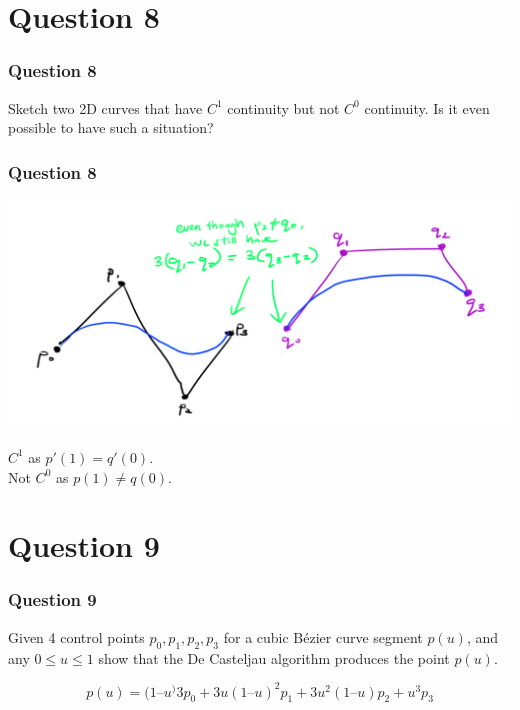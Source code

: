 \documentclass{beamer}
\begin{document}
\section{Question 8}

\begin{frame}
    \frametitle{Question 8}
    Sketch two 2D curves that have $C^1$ continuity but not $C^0$ continuity. Is it even possible to have such a situation?
\end{frame}

\begin{frame}
    \frametitle{Question 8}

    \centering
    \includegraphics[scale=0.4]{q8.png}
    \vspace{1em}

    $C^1$ as $p'(1) = q'(0)$.\\
    Not $C^0$ as $p(1) \neq q(0)$.

\end{frame}

\section{Question 9}

\begin{frame}
    \frametitle{Question 9}
    Given 4 control points $p_0, p_1, p_2, p_3$ for a cubic Bézier curve segment $p(u)$, and any $0 \le u \le 1$
    show that the De Casteljau algorithm produces the point $p(u)$.

    \begin{tcolorbox}
        \begin{equation}
            p(u) = (1–u^)3 p_0 + 3u (1–u)^2 p_1 + 3u^2 (1–u) p_2 + u^3 p_3
        \end{equation}
    \end{tcolorbox}
\end{frame}
\end{document}
